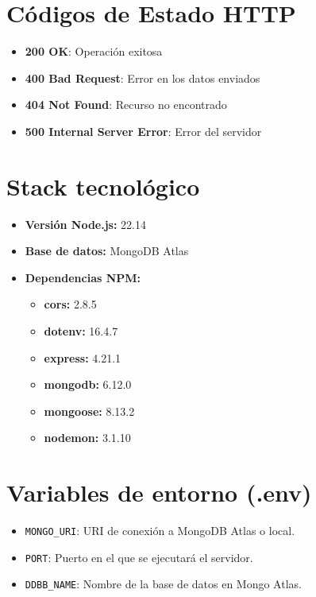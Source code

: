 \documentclass[12pt]{article}
\begin{document}
\section{Códigos de Estado HTTP}

\begin{itemize}
    \item \textbf{200 OK}: Operación exitosa
    \item \textbf{400 Bad Request}: Error en los datos enviados
    \item \textbf{404 Not Found}: Recurso no encontrado
    \item \textbf{500 Internal Server Error}: Error del servidor
\end{itemize}

\section{Stack tecnológico}

\begin{itemize}
    \item \textbf{Versión Node.js:} 22.14
    \item \textbf{Base de datos:} MongoDB Atlas
    \item \textbf{Dependencias NPM:}
    \begin{itemize}
        \item \textbf{cors:} 2.8.5
        \item \textbf{dotenv:} 16.4.7
        \item \textbf{express:} 4.21.1
        \item \textbf{mongodb:} 6.12.0
        \item \textbf{mongoose:} 8.13.2
        \item \textbf{nodemon:} 3.1.10  
    \end{itemize}
\end{itemize}

\section{Variables de entorno (.env)}

    \begin{itemize}
    \item \texttt{MONGO\_URI}: URI de conexión a MongoDB Atlas o local.
    \item \texttt{PORT}: Puerto en el que se ejecutará el servidor.
    \item \texttt{DDBB\_NAME}: Nombre de la base de datos en Mongo Atlas.
\end{itemize}
\end{document}
